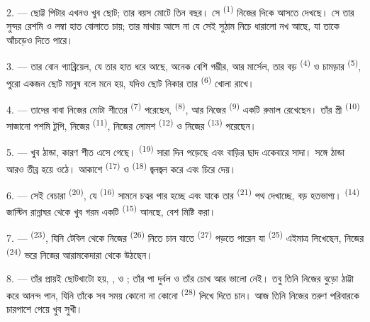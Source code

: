 2. --- ছোট্ট পিটার এখনও খুব ছোট; তার বয়স মোটে তিন বছর। সে 
\textsuperscript{(1)} নিজের দিকে আসতে দেখছে। সে তার সুন্দর রেশমি  ও
লম্বা  হাত বোলাতে চায়; তার মাথায় আসে না যে সেই সুঠাম
 নিচে ধারালো নখ আছে, যা তাকে আঁচড়েও দিতে পারে।

3. --- তার বোন গ্যাব্রিয়েল, যে তার হাত ধরে আছে, অনেক বেশি গম্ভীর, আর
মার্সেল, তার বড়  \textsuperscript{(4)} ও চামড়ার
 \textsuperscript{(5)}, পুরো একজন ছোট মানুষ বলে মনে হয়, যদিও
ছোট নিকার তার  \textsuperscript{(6)} খোলা রাখে।

4. --- তাদের বাবা নিজের মোটা শীতের  \textsuperscript{(7)}
পরেছেন,  \textsuperscript{(8)}, আর নিজের 
\textsuperscript{(9)} একটি রুমাল রেখেছেন। তাঁর স্ত্রী 
\textsuperscript{(10)} সাজানো পশমি টুপি, নিজের 
\textsuperscript{(11)}, নিজের লোমশ  \textsuperscript{(12)} ও নিজের
 \textsuperscript{(13)} পরেছেন।

5. --- খুব ঠান্ডা, কারণ শীত এসে গেছে।  \textsuperscript{(19)} সারা
দিন পড়েছে এবং বাড়ির ছাদ একেবারে সাদা।  সঙ্গে ঠান্ডা আরও
তীব্র হয়ে ওঠে। আকাশে  \textsuperscript{(17)} ও 
\textsuperscript{(18)} জ্বলজ্বল করে এবং  চিরে দেয়।

\VUsaut{4.2mm}
\VUsaut{3.0mm}

6. --- সেই বেচারা  \textsuperscript{(20)}, যে
 \textsuperscript{(16)} সামনে চত্বর পার হচ্ছে এবং যাকে
তার  \textsuperscript{(21)} পথ দেখাচ্ছে, বড় হতভাগ্য।
 \textsuperscript{(14)} জাস্টিন রান্নাঘর থেকে খুব গরম
 একটি  \textsuperscript{(15)} আনছে, বেশ মিষ্টি করা।

7. ---  \textsuperscript{(23)}, যিনি টেবিল থেকে নিজের
 \textsuperscript{(26)} নিতে চান যাতে 
\textsuperscript{(27)} পড়তে পারেন যা  \textsuperscript{(25)} এইমাত্র
লিখেছেন, নিজের  \textsuperscript{(24)} ভরে নিজের আরামকেদারা থেকে
উঠছেন।

8. --- তাঁর প্রায়ই ছোটখাটো  হয়, ,
 ও ; তাঁর পা দুর্বল ও তাঁর চোখ আর ভালো
নেই। তবু তিনি নিজের বুড়ো  ঠাট্টা করে আনন্দ পান, যিনি
তাঁকে সব সময় কোনো না কোনো  \textsuperscript{(28)} লিখে দিতে চান।
আজ তিনি নিজের তরুণ পরিবারকে চারপাশে পেয়ে খুব সুখী।


